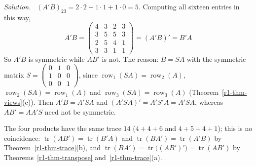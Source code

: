 \documentclass[12pt]{article}
\DeclareMathOperator{\tr}{tr}
\DeclareMathOperator{\row}{row}
\theoremstyle{definition}
\newenvironment{solution}{\par\noindent\textit{Solution.}\ }{\par\smallskip}
\begin{document}
\begin{solution}
\((A'B)_{23}=2\cdot2+1\cdot1+1\cdot0=5\). Computing all sixteen entries in this way,
\[
A'B=\begin{pmatrix}4&3&2&3\\3&5&5&3\\2&5&4&1\\3&3&1&1\end{pmatrix}=(A'B)'=B'A
\]
So \(A'B\) is symmetric while \(AB'\) is not. The reason: \(B=SA\) with the symmetric matrix
\(S=\left(\begin{smallmatrix}0&1&0\\1&0&0\\0&0&1\end{smallmatrix}\right)\), since
\(\row_1(SA)=\row_2(A)\), \(\row_2(SA)=\row_1(A)\) and \(\row_3(SA)=\row_3(A)\)
(Theorem~\ref{r1-thm-views}(c)). Then \(A'B=A'SA\) and \((A'SA)'=A'S'A=A'SA\), whereas
\(AB'=AA'S\) need not be symmetric.

The four products have the same trace \(14\) (\(4+4+6\) and \(4+5+4+1\)); this is no
coincidence: \(\tr(AB')=\tr(B'A)\) and \(\tr(BA')=\tr(A'B)\) by
Theorem~\ref{r1-thm-trace}(b), and \(\tr(BA')=\tr\bigl((AB')'\bigr)=\tr(AB')\) by
Theorems~\ref{r1-thm-transpose} and~\ref{r1-thm-trace}(a).
\end{solution}
\end{document}
